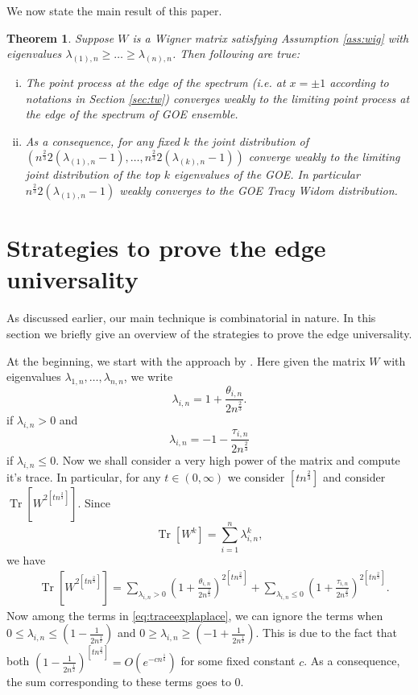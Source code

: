 \documentclass[12pt]{article}
\numberwithin{equation}{section}
\newtheorem{theorem}{Theorem}[section]
\numberwithin{equation}{section}
\theoremstyle{definition}
\DeclareMathOperator{\Tr}{Tr}
\renewcommand{\1}{\bf 1}
\begin{document}
\noindent 
We now state the main result of this paper.
\begin{theorem}\label{thm:universal}
Suppose $W$ is a Wigner matrix satisfying Assumption \ref{ass:wig} with eigenvalues $\lambda_{(1),n}\ge \ldots \ge\lambda_{(n),n}$. Then following are true:
\begin{enumerate}[(i)]
\item The point process at the edge of the spectrum (i.e. at $x=\pm 1$ according to notations in Section \ref{sec:tw}) converges weakly to the limiting point process at the edge of the spectrum of GOE ensemble.  
\item As a consequence, for any fixed $k$ the joint distribution of $\left(n^{\frac{2}{3}}2\left(\lambda_{(1),n}-1\right), \ldots, n^{\frac{2}{3}}2\left(\lambda_{(k),n} -1 \right) \right)$ converge weakly to the limiting joint distribution of the top $k$ eigenvalues of the GOE. In particular $n^{\frac{2}{3}}2\left(\lambda_{(1),n}-1\right)$ weakly converges to the GOE Tracy Widom distribution.
\end{enumerate} 
\end{theorem}
\section{Strategies to prove the edge universality}
As discussed earlier, our main technique is combinatorial in nature. In this section we briefly give an overview of the strategies to prove the edge universality. 

\noindent
At the beginning, we start with the approach by \citet{sosh}. Here given the matrix $W$ with eigenvalues $\lambda_{1,n}, \ldots , \lambda_{n,n}$, we write 
\[
\lambda_{i,n}= 1+ \frac{\theta_{i,n}}{2n^{\frac{2}{3}}}.
\]
if $\lambda_{i,n}>0$ and 
\[
\lambda_{i,n} = -1 - \frac{\tau_{i,n}}{2n^{\frac{2}{3}}}
\] if  $\lambda_{i,n}\le 0$.
Now we shall consider a very high power of the matrix and compute it's trace. In particular, for any $t \in (0,\infty)$ we consider $[tn^{\frac{2}{3}}]$ and consider $\Tr\left[ W^{2[tn^{\frac{2}{3}}] } \right]$. Since 
\[
\Tr[W^{k}] = \sum_{i=1}^{n} \lambda_{i,n}^{k},
\] 
we have 
\begin{equation}\label{eq:traceexplaplace}
\begin{split}
&\Tr[W^{2[tn^{\frac{2}{3}}]}]= \sum_{\lambda_{i,n}>0} \left(1+ \frac{\theta_{i,n}}{2n^{\frac{2}{3}}}\right)^{2[tn^{\frac{2}{3}}]}+ \sum_{\lambda_{i,n}\le 0} \left( 1+ \frac{\tau_{i,n}}{2n^{\frac{2}{3}}} \right)^{2[tn^{\frac{2}{3}}]}.
\end{split}
\end{equation}
Now among the terms in \eqref{eq:traceexplaplace}, we can ignore the terms when $0\le \lambda_{i,n} \le \left( 1- \frac{1}{2n^{\frac{1}{2}}} \right)$  and $0 \ge \lambda_{i,n} \ge (-1 + \frac{1}{2n^{\frac{1}{2}}}) $. This is due to the fact that both $\left(1- \frac{1}{2n^{\frac{1}{2}}}\right)^{[tn^{\frac{2}{3}}]}= O\left(e^{-cn^{\frac{1}{6}}}\right)$ for some fixed constant $c$. As a consequence, the sum corresponding to these terms goes to $0$.  
\end{document}
